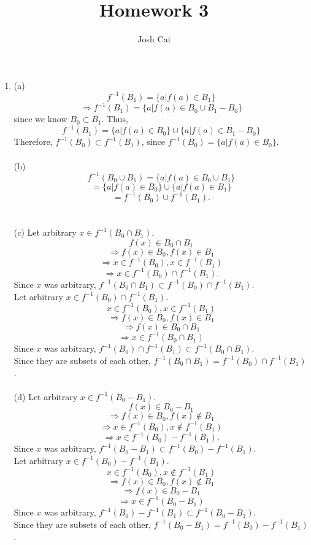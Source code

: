 \documentclass{article}
\begin{document}
\title{Homework 3}
\author{Josh Cai}

\maketitle


\begin{enumerate}
\item
(a) \[f^{-1}(B_1)=\{a|f(a)\in B_1\}\]
\[\Rightarrow f^{-1}(B_1)=\{a|f(a)\in B_0 \cup B_1 - B_0\}\] since we know $B_0 \subset B_1$. Thus,
\[f^{-1}(B_1)=\{a|f(a)\in B_0\} \cup \{a|f(a)\in B_1 - B_0\}\]
Therefore, $f^{-1}(B_0) \subset f^{-1}(B_1)$, since $f^{-1}(B_0)=\{a|f(a)\in B_0\}$.
\\\\(b) \[f^{-1}(B_0 \cup B_1)=\{a|f(a)\in B_0 \cup B_1\}\]
\[=\{a|f(a)\in B_0\}\cup \{a|f(a)\in B_1\}\]
\[=f^{-1}(B_0) \cup f^{-1}(B_1).\]
\\\\(c) Let arbitrary $x \in f^{-1}(B_0 \cap B_1)$. 
\[f(x) \in B_0 \cap B_1\]
\[\Rightarrow f(x) \in B_0,f(x) \in B_1\] 
\[\Rightarrow x\in f^{-1}(B_0), x \in f^{-1}(B_1)\]
\[\Rightarrow x \in f^{-1}(B_0) \cap f^{-1}(B_1).\] Since $x$ was arbitrary, $f^{-1}(B_0 \cap B_1) \subset f^{-1}(B_0) \cap f^{-1}(B_1)$.
\\ Let arbitrary $x \in f^{-1}(B_0) \cap f^{-1}(B_1)$. 
\[x \in f^{-1}(B_0),x \in f^{-1}(B_1)\]
\[\Rightarrow f(x) \in B_0, f(x) \in B_1\]
\[\Rightarrow f(x) \in B_0 \cap B_1\]
\[\Rightarrow x \in f^{-1}(B_0 \cap B_1)\]
Since $x$ was arbitrary, $f^{-1}(B_0) \cap f^{-1}(B_1) \subset f^{-1}(B_0 \cap B_1)$.\\
Since they are subsets of each other, $f^{-1}(B_0 \cap B_1) = f^{-1}(B_0) \cap f^{-1}(B_1) $.
\\\\(d)  Let arbitrary $x \in f^{-1}(B_0 - B_1)$. 
\[f(x) \in B_0 - B_1\]
\[\Rightarrow f(x) \in B_0,f(x) \not\in B_1\]
\[\Rightarrow x\in f^{-1}(B_0), x \not\in f^{-1}(B_1)\]
\[\Rightarrow x \in f^{-1}(B_0) - f^{-1}(B_1).\] Since $x$ was arbitrary, $f^{-1}(B_0 - B_1) \subset f^{-1}(B_0) - f^{-1}(B_1)$.
\\ Let arbitrary $x \in f^{-1}(B_0) - f^{-1}(B_1)$.
\[x \in f^{-1}(B_0),x \not\in f^{-1}(B_1)\]
\[\Rightarrow f(x) \in B_0, f(x) \not\in B_1\]
\[\Rightarrow f(x) \in B_0 - B_1\]
\[\Rightarrow x \in f^{-1}(B_0 - B_1)\]
Since $x$ was arbitrary, $f^{-1}(B_0) - f^{-1}(B_1) \subset f^{-1}(B_0 - B_1)$.\\
Since they are subsets of each other, $f^{-1}(B_0 - B_1) = f^{-1}(B_0) - f^{-1}(B_1)$.

\end{enumerate}
\end{document}
